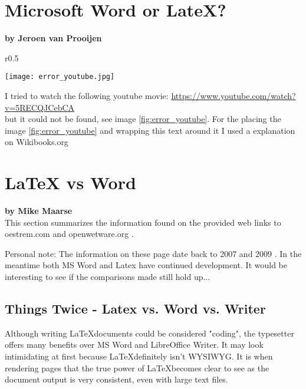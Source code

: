 \section{Microsoft Word or LateX?}
\textbf{by Jeroen van Prooijen}\\

\begin{wrapfigure}{r}{0.5\textwidth}
 \vspace{-20pt}
 \begin{center}
  \texttt{[image: error\_youtube.jpg]}
 \end{center}
 \vspace{-20pt}
 \caption{screenshot youtube error}
 \vspace{-10pt}
\label{fig:error_youtube}
\end{wrapfigure}

I tried to watch the following youtube movie: \url{https://www.youtube.com/watch?v=5RECQJCebCA}\\
but it could not be found, see image \ref{fig:error_youtube}. For the placing the image \ref{fig:error_youtube} and wrapping this
text around it I used a explanation on Wikibooks.org\cite{wikibooks_figures}

\section{LaTeX vs Word}
\textbf{by Mike Maarse}\\

This section summarizes the information found on the provided web links to oestrem.com \cite{oestrem} and openwetware.org \cite{openwetware}.

\vspace{2mm}

Personal note: The information on these page date back to 2007 \cite{oestrem} and 2009 \cite{openwetware}. In the meantime both MS Word and Latex have continued development. It would be interesting to see if the comparisons made still hold up...

\subsection{Things Twice - Latex vs. Word vs. Writer}
Although writing \LaTeX documents could be considered "coding", the typesetter offers many benefits over MS Word and LibreOffice Writer. It may look intimidating at first because \LaTeX definitely isn't WYSIWYG. It is when rendering pages that the true power of \LaTeX becomes clear to see as the document output is very consistent, even with large text files.

